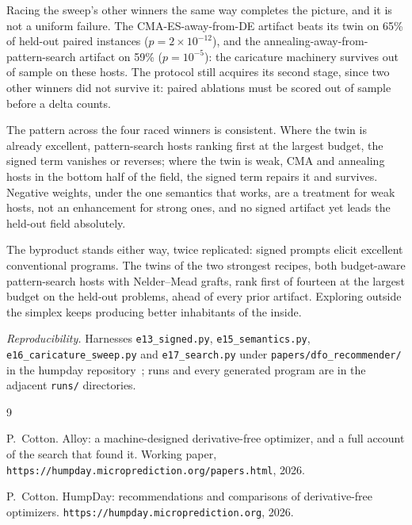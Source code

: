 \documentclass[11pt]{article}
\begin{document}
Racing the sweep's other winners the same way completes the picture, and
it is not a uniform failure. The CMA-ES-away-from-DE artifact beats its
twin on 65\% of held-out paired instances ($p = 2\times10^{-12}$), and
the annealing-away-from-pattern-search artifact on 59\%
($p = 10^{-5}$): the caricature machinery survives out of sample on these
hosts. The protocol still acquires its second stage, since two other
winners did not survive it: paired ablations must be scored out of sample
before a delta counts.

The pattern across the four raced winners is consistent. Where the twin is
already excellent, pattern-search hosts ranking first at the largest
budget, the signed term vanishes or reverses; where the twin is weak, CMA
and annealing hosts in the bottom half of the field, the signed term
repairs it and survives. Negative weights, under the one semantics that
works, are a treatment for weak hosts, not an enhancement for strong ones,
and no signed artifact yet leads the held-out field absolutely.

The byproduct stands either way, twice replicated: signed prompts elicit
excellent conventional programs. The twins of the two strongest recipes,
both budget-aware pattern-search hosts with Nelder--Mead grafts, rank
first of fourteen at the largest budget on the held-out problems, ahead of
every prior artifact. Exploring outside the simplex keeps producing better
inhabitants of the inside.

\vspace{1em}
\noindent\emph{Reproducibility.} Harnesses
\texttt{e13\_signed.py}, \texttt{e15\_semantics.py},
\texttt{e16\_caricature\_sweep.py} and \texttt{e17\_search.py} under
\texttt{papers/dfo\_recommender/} in the humpday
repository~\cite{humpday}; runs and every generated program are in the
adjacent \texttt{runs/} directories.

\begin{thebibliography}{9}

 P.~Cotton.
Alloy: a machine-designed derivative-free optimizer, and a full account of
the search that found it.
Working paper, \texttt{https://humpday.microprediction.org/papers.html},
2026.

 P.~Cotton.
HumpDay: recommendations and comparisons of derivative-free optimizers.
\texttt{https://humpday.microprediction.org}, 2026.

\end{thebibliography}
\end{document}
